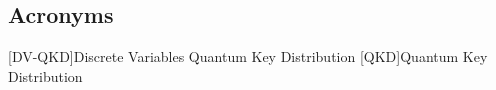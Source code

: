 \clearpage
\subsection*{Acronyms}\label{sec:acronyms}
\begin{acronym}[TDMA]
	[DV-QKD]{Discrete Variables Quantum Key Distribution}
	[QKD]{Quantum Key Distribution}
\end{acronym}
\pagebreak 